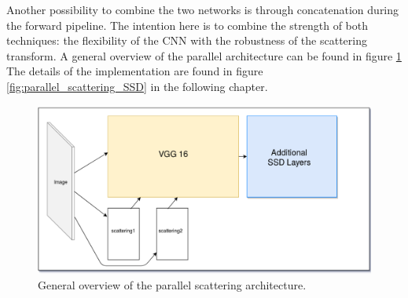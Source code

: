Another possibility to combine the two networks is through concatenation during the forward pipeline. The intention here is to combine the strength of both techniques: the flexibility of the CNN with the robustness of the scattering transform. A general overview of the parallel architecture can be found in figure \ref{fig:parallel_scattering_overview} The details of the implementation are found in figure \ref{fig:parallel_scattering_SSD} in the following chapter. 

\begin{figure}[!htb]
	\centering
	\includegraphics[width=\textwidth]{images/parallel_scattering_overview.png}
	\caption{General overview of the parallel scattering architecture.}
	\label{fig:parallel_scattering_overview}	
\end{figure}
